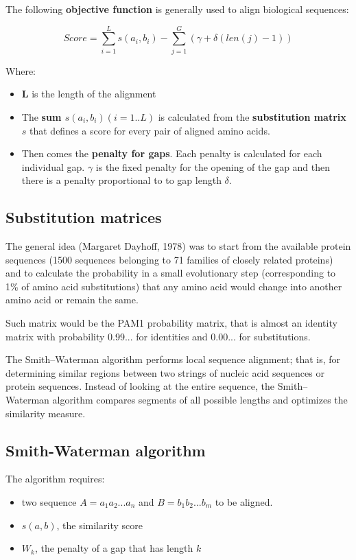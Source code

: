 The following \textbf{objective function} is generally used to align biological
sequences:

\begin{equation}
Score = \sum_{i=1}^{L} s(a_i,b_i) - \sum_{j=1}^{G} (\gamma + \delta(len(j)-1))
\end{equation}

Where:
\begin{itemize}
  \item \textbf{L} is the length of the alignment
  \item The \textbf{sum $s(a_i,b_i) (i=1..L) $} is calculated from the
\textbf{substitution matrix} $s$ that defines a score for every pair of aligned
amino acids.
  \item Then comes the \textbf{penalty for gaps}. Each penalty is calculated
 for each individual gap. \textbf{$\gamma$} is the fixed penalty for the
 opening of the gap and then there is a penalty proportional to to gap length
\textbf{$\delta$}.
\end{itemize}

\subsection{Substitution matrices}

The general idea (Margaret Dayhoff, 1978) was to start from the available
protein sequences (1500 sequences belonging to 71 families of closely related
proteins) and to calculate the probability in a small evolutionary step
(corresponding to 1\% of amino acid substitutions) that any amino acid would
change into another amino acid or remain the same.

Such matrix would be the PAM1 probability matrix, that is almost an identity
matrix with probability 0.99... for identities and 0.00... for substitutions.

The Smith–Waterman algorithm performs local sequence alignment; that is, for
determining similar regions between two strings of nucleic acid sequences or
protein sequences. Instead of looking at the entire sequence, the
Smith–Waterman algorithm compares segments of all possible lengths and
optimizes the similarity measure.

\subsection{Smith-Waterman algorithm}

The algorithm requires:

\begin{itemize}
  \item two sequence $A = a_{1}a_{2}...a_{n}$ and $B = b_{1}b_{2}...b_{m}$ to
be aligned.
  \item $s(a,b)$, the similarity score
  \item $W_k$, the penalty of a gap that has length $k$
\end{itemize}

